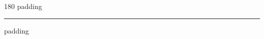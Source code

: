 
\begin{frame}
\begin{center}
\begin{turn}{180}
{\fontsize{2.5cm}{1em}\selectfont padding}
\end{turn}
\vspace{1em}\par  
\hrule
\vspace{1em}\par  
{\fontsize{2.5cm}{1em}\selectfont padding}
\end{center}
\end{frame}
